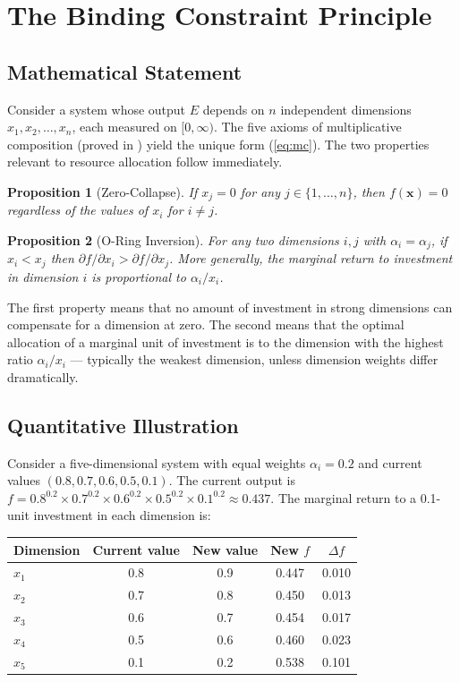 \documentclass[12pt]{article}
\newtheorem{proposition}{Proposition}
\begin{document}
\section{The Binding Constraint Principle}
\label{sec:theory}

\subsection{Mathematical Statement}

Consider a system whose output $E$ depends on $n$ independent dimensions $x_1, x_2, \ldots, x_n$, each measured on $[0, \infty)$. The five axioms of multiplicative composition (proved in \citet{kirsch2026mc}) yield the unique form (\ref{eq:mc}). The two properties relevant to resource allocation follow immediately.

\begin{proposition}[Zero-Collapse]
\label{prop:zero}
If $x_j = 0$ for any $j \in \{1, \ldots, n\}$, then $f(\mathbf{x}) = 0$ regardless of the values of $x_i$ for $i \neq j$.
\end{proposition}

\begin{proposition}[O-Ring Inversion]
\label{prop:inversion}
For any two dimensions $i, j$ with $\alpha_i = \alpha_j$, if $x_i < x_j$ then $\partial f / \partial x_i > \partial f / \partial x_j$. More generally, the marginal return to investment in dimension $i$ is proportional to $\alpha_i / x_i$.
\end{proposition}

The first property means that no amount of investment in strong dimensions can compensate for a dimension at zero. The second means that the optimal allocation of a marginal unit of investment is to the dimension with the highest ratio $\alpha_i / x_i$ --- typically the weakest dimension, unless dimension weights differ dramatically.

\subsection{Quantitative Illustration}

Consider a five-dimensional system with equal weights $\alpha_i = 0.2$ and current values $(0.8, 0.7, 0.6, 0.5, 0.1)$. The current output is $f = 0.8^{0.2} \times 0.7^{0.2} \times 0.6^{0.2} \times 0.5^{0.2} \times 0.1^{0.2} \approx 0.437$. The marginal return to a 0.1-unit investment in each dimension is:

\begin{center}
\begin{tabular}{lcccc}
\toprule
Dimension & Current value & New value & New $f$ & $\Delta f$ \\
\midrule
$x_1$ & 0.8 & 0.9 & 0.447 & 0.010 \\
$x_2$ & 0.7 & 0.8 & 0.450 & 0.013 \\
$x_3$ & 0.6 & 0.7 & 0.454 & 0.017 \\
$x_4$ & 0.5 & 0.6 & 0.460 & 0.023 \\
$x_5$ & 0.1 & 0.2 & 0.538 & 0.101 \\
\bottomrule
\end{tabular}
\end{center}
\end{document}
